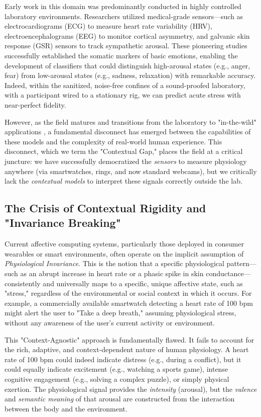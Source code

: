 \documentclass[journal]{IEEEtran}
\begin{document}
Early work in this domain was predominantly conducted in highly controlled laboratory environments. 
Researchers utilized medical-grade sensors—such as electrocardiograms (ECG) to measure heart rate variability (HRV), 
electroencephalograms (EEG) to monitor cortical asymmetry, and galvanic skin response (GSR) sensors to track sympathetic arousal. 
These pioneering studies successfully established the somatic markers of basic emotions, enabling the development of classifiers 
that could distinguish high-arousal states (e.g., anger, fear) from low-arousal states (e.g., sadness, relaxation) with remarkable accuracy. 
Indeed, within the sanitized, noise-free confines of a sound-proofed laboratory, with a participant wired to a stationary rig, 
we can predict acute stress with near-perfect fidelity.

However, as the field matures and transitions from the laboratory to "in-the-wild" applications \cite{ambulatory_assessment}, 
a fundamental disconnect has emerged between the capabilities of these models and the complexity of real-world human experience. 
This disconnect, which we term the "Contextual Gap," places the field at a critical juncture: we have successfully democratized 
the \textit{sensors} to measure physiology anywhere (via smartwatches, rings, and now standard webcams), 
but we critically lack the \textit{contextual models} to interpret these signals correctly outside the lab.

\subsection{The Crisis of Contextual Rigidity and "Invariance Breaking"}
Current affective computing systems, particularly those deployed in consumer wearables or smart environments, 
often operate on the implicit assumption of \textit{Physiological Invariance}. 
This is the notion that a specific physiological pattern—such as an abrupt increase in heart rate or a phasic spike in skin conductance—
consistently and universally maps to a specific, unique affective state, such as "stress," regardless of the environmental or social context in which it occurs. 
For example, a commercially available smartwatch detecting a heart rate of 100 bpm might alert the user to "Take a deep breath," assuming physiological stress, 
without any awareness of the user's current activity or environment.

This "Context-Agnostic" approach is fundamentally flawed. It fails to account for the rich, adaptive, and context-dependent nature of human physiology. 
A heart rate of 100 bpm could indeed indicate distress (e.g., during a conflict), but it could equally indicate excitement (e.g., watching a sports game), 
intense cognitive engagement (e.g., solving a complex puzzle), or simply physical exertion. 
The physiological signal provides the \textit{intensity} (arousal), but the \textit{valence} and \textit{semantic meaning} 
of that arousal are constructed from the interaction between the body and the environment.
\end{document}
